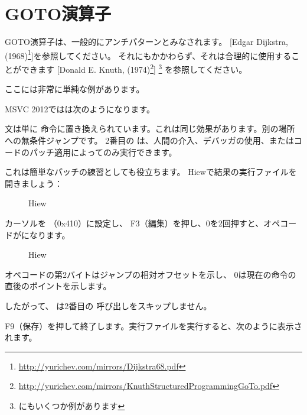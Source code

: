 \section{GOTO演算子}

GOTO演算子は、一般的にアンチパターンとみなされます。
[Edgar Dijkstra,  (1968)\footnote{\url{http://yurichev.com/mirrors/Dijkstra68.pdf}}]を参照してください。 
それにもかかわらず、それは合理的に使用することができます
[Donald E. Knuth,  (1974)\footnote{\url{http://yurichev.com/mirrors/KnuthStructuredProgrammingGoTo.pdf}}]
\footnote{\InSqBrackets{\CNotes} にもいくつか例があります}
を参照してください。

ここには非常に単純な例があります。



MSVC 2012ではは次のようになります。



文は単に \JMP 命令に置き換えられています。これは同じ効果があります。別の場所への無条件ジャンプです。 
2番目の \printf は、人間の介入、デバッガの使用、またはコードのパッチ適用によってのみ実行できます。

\par

\clearpage

これは簡単なパッチの練習としても役立ちます。 Hiewで結果の実行ファイルを開きましょう：

\begin{figure}[H]
\centering
{}
\caption{Hiew}
\label{fig:goto_hiew1}
\end{figure}

\clearpage
カーソルを \JMP （0x410）に設定し、
F3（編集）を押し、0を2回押すと、オペコードがになります。

\begin{figure}[H]
\centering
{}
\caption{Hiew}
\label{fig:goto_hiew2}
\end{figure}

\JMP オペコードの第2バイトはジャンプの相対オフセットを示し、
0は現在の命令の直後のポイントを示します。

したがって、 \JMP は2番目の \printf 呼び出しをスキップしません。

F9（保存）を押して終了します。実行ファイルを実行すると、次のように表示されます。

